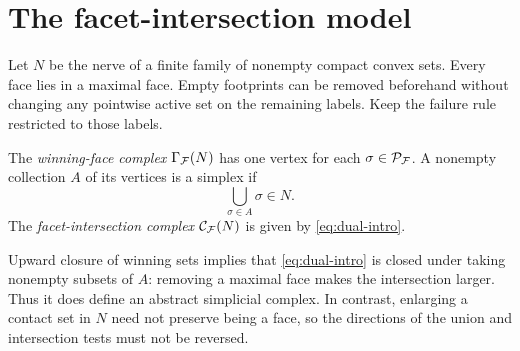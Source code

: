 \section{The facet-intersection model}
\label{sec:duality}
Let $N$ be the nerve of a finite family of nonempty compact convex sets. Every face lies in a maximal face. Empty footprints can be removed beforehand without changing any pointwise active set on the remaining labels. Keep the failure rule restricted to those labels.

\begin{definition}
The \emph{winning-face complex} $\Gamma_{\mathcal F}(N)$ has one vertex for each $\sigma\in\mathcal P_{\mathcal F}$. A nonempty collection $A$ of its vertices is a simplex if
\begin{equation}\label{eq:Gamma}
\bigcup_{\sigma\in A}\sigma\in N.
\end{equation}
The \emph{facet-intersection complex} $\mathcal C_{\mathcal F}(N)$ is given by \cref{eq:dual-intro}.
\end{definition}
Upward closure of winning sets implies that \cref{eq:dual-intro} is closed under taking nonempty subsets of $A$: removing a maximal face makes the intersection larger. Thus it does define an abstract simplicial complex. In contrast, enlarging a contact set in $N$ need not preserve being a face, so the directions of the union and intersection tests must not be reversed.

